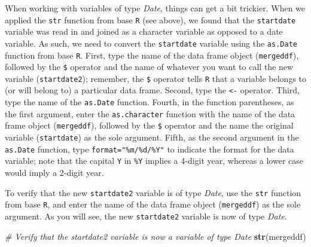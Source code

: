 \documentclass[]{book}
\newenvironment{Shaded}{\begin{snugshade}}{\end{snugshade}}
\newcommand{\KeywordTok}[1]{\textcolor[rgb]{0.13,0.29,0.53}{\textbf{#1}}}
\newcommand{\DataTypeTok}[1]{\textcolor[rgb]{0.13,0.29,0.53}{#1}}
\newcommand{\StringTok}[1]{\textcolor[rgb]{0.31,0.60,0.02}{#1}}
\newcommand{\CommentTok}[1]{\textcolor[rgb]{0.56,0.35,0.01}{\textit{#1}}}
\newcommand{\OperatorTok}[1]{\textcolor[rgb]{0.81,0.36,0.00}{\textbf{#1}}}
\newcommand{\NormalTok}[1]{#1}
\begin{document}
When working with variables of type \emph{Date}, things can get a bit
trickier. When we applied the \texttt{str} function from base \texttt{R}
(see above), we found that the \texttt{startdate} variable was read in
and joined as a character variable as opposed to a date variable. As
such, we need to convert the \texttt{startdate} variable using the
\texttt{as.Date} function from base \texttt{R}. First, type the name of
the data frame object (\texttt{mergeddf}), followed by the \texttt{\$}
operator and the name of whatever you want to call the new variable
(\texttt{startdate2}); remember, the \texttt{\$} operator tells
\texttt{R} that a variable belongs to (or will belong to) a particular
data frame. Second, type the \texttt{\textless{}-} operator. Third, type
the name of the \texttt{as.Date} function. Fourth, in the function
parentheses, as the first argument, enter the \texttt{as.character}
function with the name of the data frame object (\texttt{mergeddf}),
followed by the \texttt{\$} operator and the name the original variable
(\texttt{startdate}) as the sole argument. Fifth, as the second argument
in the \texttt{as.Date} function, type \texttt{format="\%m/\%d/\%Y"} to
indicate the format for the data variable; note that the capital
\texttt{Y} in \texttt{\%Y} implies a 4-digit year, whereas a lower case
would imply a 2-digit year.

\begin{Shaded}
\end{Shaded}

To verify that the new \texttt{startdate2} variable is of type
\emph{Date}, use the \texttt{str} function from base \texttt{R}, and
enter the name of the data frame object (\texttt{mergeddf}) as the sole
argument. As you will see, the new \texttt{startdate2} variable is now
of type \emph{Date}.

\begin{Shaded}
\begin{Highlighting}[]
\CommentTok{# Verify that the startdate2 variable is now a variable of type Date}
\KeywordTok{str}\NormalTok{(mergeddf)}
\end{Highlighting}
\end{Shaded}
\end{document}
